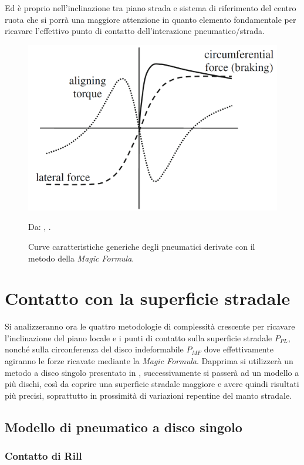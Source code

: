 Ed è proprio nell'inclinazione tra piano strada e sistema di riferimento del centro ruota che si porrà una maggiore attenzione in quanto elemento fondamentale per ricavare l'effettivo punto di contatto dell'interazione pneumatico/strada.
%
\begin{figure}[h]
	\centering
	\includegraphics[width=0.58\linewidth]{Figures/pacejka}
	\caption{Curve caratteristiche generiche degli pneumatici derivate con il metodo della \textit{Magic Formula}.}
	Da: \citeauthor{Schramm}, .
	\label{pacejka}
\end{figure}
%
\section{Contatto con la superficie stradale}
%
Si analizzeranno ora le quattro metodologie di complessità crescente per ricavare l'inclinazione del piano locale e i punti di contatto sulla superficie stradale $P_{PL}$, nonché sulla circonferenza del disco indeformabile $P_{MF}$ dove effettivamente agiranno le forze ricavate mediante la \textit{Magic Formula}. Dapprima si utilizzerà un metodo a disco singolo presentato in \cite{Rill}, successivamente si passerà ad un modello a più dischi, così da coprire una superficie stradale maggiore e avere quindi risultati più precisi, soprattutto in prossimità di variazioni repentine del manto stradale.
%
\subsection{Modello di pneumatico a disco singolo}
%
\subsubsection{Contatto di Rill}
\label{Contatto_Rill}
%
